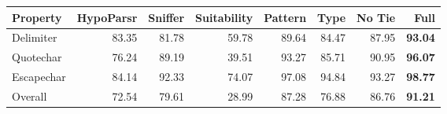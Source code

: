 \begin{tabular}{lrrr|rrrr}
Property & HypoParsr & Sniffer & Suitability & Pattern & Type & No Tie & Full\\
\hline
Delimiter & 83.35 & 81.78 & 59.78 & 89.64 & 84.47 & 87.95 & \textbf{93.04}\\
Quotechar & 76.24 & 89.19 & 39.51 & 93.27 & 85.71 & 90.95 & \textbf{96.07}\\
Escapechar & 84.14 & 92.33 & 74.07 & 97.08 & 94.84 & 93.27 & \textbf{98.77}\\
Overall & 72.54 & 79.61 & 28.99 & 87.28 & 76.88 & 86.76 & \textbf{91.21}\\
\hline
\end{tabular}